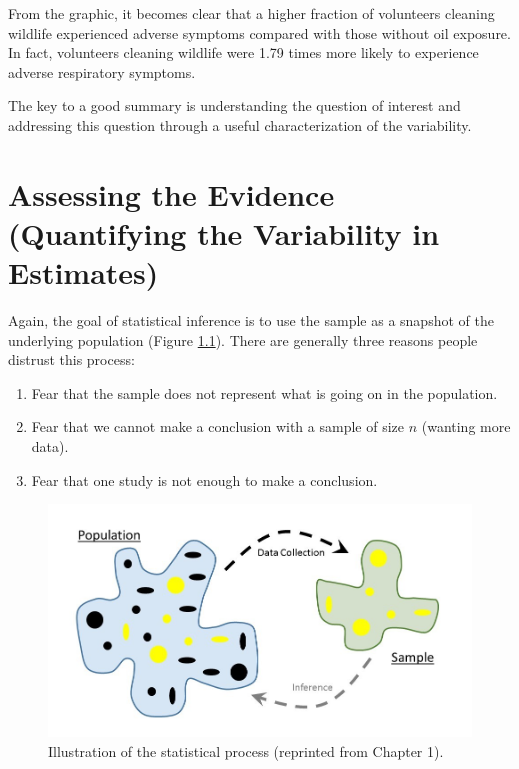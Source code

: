 \documentclass[]{book}
\providecommand{\tightlist}{%
  \setlength{\itemsep}{0pt}\setlength{\parskip}{0pt}}
\theoremstyle{definition}
\theoremstyle{definition}
\theoremstyle{remark}
\begin{document}
From the graphic, it becomes clear that a higher fraction of volunteers
cleaning wildlife experienced adverse symptoms compared with those
without oil exposure. In fact, volunteers cleaning wildlife were 1.79
times more likely to experience adverse respiratory symptoms.

The key to a good summary is understanding the question of interest and
addressing this question through a useful characterization of the
variability.

\chapter{Assessing the Evidence (Quantifying the Variability in
Estimates)}\label{SamplingDistns}

Again, the goal of statistical inference is to use the sample as a
snapshot of the underlying population (Figure
\ref{fig:samplingdistns-statistical-process}). There are generally three
reasons people distrust this process:

\begin{enumerate}
\def\labelenumi{\arabic{enumi}.}
\tightlist
\item
  Fear that the sample does not represent what is going on in the
  population.
\item
  Fear that we cannot make a conclusion with a sample of size \(n\)
  (wanting more data).
\item
  Fear that one study is not enough to make a conclusion.
\end{enumerate}

\begin{figure}

{\centering \includegraphics[width=0.8\linewidth]{images/Basics-Stat-Process} 

}

\caption{Illustration of the statistical process (reprinted from Chapter 1).}\label{fig:samplingdistns-statistical-process}
\end{figure}
\end{document}
